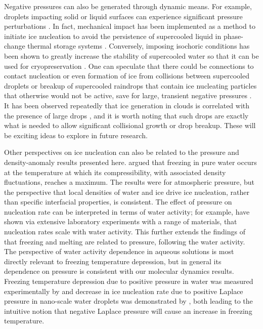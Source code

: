 \documentclass[journal abbreviation, manuscript]{copernicus}
\begin{document}
Negative pressures can also be generated through dynamic means. For example, droplets impacting solid or liquid surfaces can experience significant pressure perturbations \citep{cheng2022drop}. In fact, mechanical impact has been implemented as a method to initiate ice nucleation to avoid the persistence of supercooled liquid in phase-change thermal storage systems \citep{wang2022nucleation}. Conversely, imposing isochoric conditions has been shown to greatly increase the stability of supercooled water so that it can be used for cryopreservation \citep{powell2020isochoric}. One can speculate that there could be connections to contact nucleation or even formation of ice from collisions between supercooled droplets \citep{alkezweeny1969freezing} or breakup of supercooled raindrops that contain ice nucleating particles that otherwise would not be active, save for large, transient negative pressures \citep{james2021impact}. It has been observed repeatedly that ice generation in clouds is correlated with the presence of large drops \citep{rangno1991ice,lance2011cloud}, and it is worth noting that such drops are exactly what is needed to allow significant collisional growth or drop breakup. These will be exciting ideas to explore in future research.

Other perspectives on ice nucleation can also be related to the pressure and density-anomaly results presented here. \citet{baker2004new} argued that freezing in pure water occurs at the temperature at which its compressibility, with associated density fluctuations, reaches a maximum. The results were for atmospheric pressure, but the perspective that local densities of water and ice drive ice nucleation, rather than specific interfacial properties, is consistent. The effect of pressure on nucleation rate can be interpreted in terms of water activity; for example, \citep{knopf2013water} have shown via extensive laboratory experiments with a range of materials, that nucleation rates scale with water activity. This further extends the findings of \citet{koop2000water} that freezing and melting are related to pressure, following the water activity. The perspective of water activity dependence in aqueous solutions is most directly relevant to freezing temperature depression, but in general its dependence on pressure is consistent with our molecular dynamics results. Freezing temperature depression due to positive pressure in water was measured experimentally by \citet{kanno1975} and decrease in ice nucleation rate due to positive Laplace pressure in nano-scale water droplets was demonstrated by \citet{Li2013}, both leading to the intuitive notion that negative Laplace pressure will cause an increase in freezing temperature.
\end{document}
